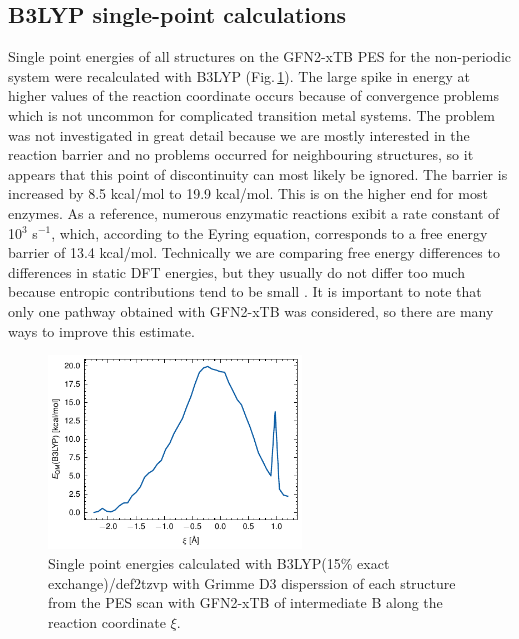 \subsection{B3LYP single-point calculations}
Single point energies of all structures on the GFN2-xTB PES for the non-periodic system were recalculated with B3LYP (Fig.\,\ref{fig:b3lyp_spc}). The large spike in energy at higher values of the reaction coordinate occurs because of convergence problems which is not uncommon for complicated transition metal systems. The problem was not investigated in great detail because we are mostly interested in the reaction barrier and no problems occurred for neighbouring structures, so it appears that this point of discontinuity can most likely be ignored. The barrier is increased by 8.5 kcal/mol to 19.9 kcal/mol. This is on the higher end for most enzymes. As a reference, numerous enzymatic reactions exibit a rate constant of 10$^3$ s$^{-1}$, which, according to the Eyring equation, corresponds to a free energy barrier of 13.4 kcal/mol. Technically we are comparing free energy differences to differences in static DFT energies, but they usually do not differ too much because entropic contributions tend to be small \cite{Claeyssens2006}. It is important to note that only one pathway obtained with GFN2-xTB was considered, so there are many ways to improve this estimate.
\begin{figure}[htbp]
    \centering
    \includegraphics[width=0.6\textwidth]{Figures/PES_b3lyp.pdf}
    \caption{Single point energies calculated with B3LYP(15\% exact exchange)/def2tzvp with Grimme D3 disperssion of each structure from the PES scan with GFN2-xTB of intermediate B along the reaction coordinate $\xi$.}
    \label{fig:b3lyp_spc}
\end{figure}

